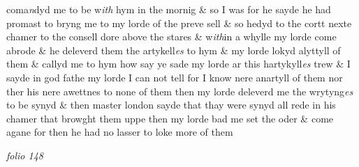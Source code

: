 \documentclass[12pt, a4paper]{book}
\begin{document}
 coma\textit{n}dyd me to be w\textit{ith} hym in the mornig \& so I was for he sayde he
 had promast to bryng me to my
			 lorde of the preve sell \& so hedyd to the
 cortt nexte chamer to the consell dore above the stares \& w\textit{ith}in a
 whylle my lorde come abrode \& he deleverd them the artykell\textit{es} to hym
 \& my lorde lokyd alyttyll of them \& callyd me to hym
			 how say ye sade
 my lorde ar this hartykyll\textit{es} trew \& I sayde in god fathe my lorde I
 can not tell for I know nere anartyll of them nor ther his nere awettnes
 to none of them then my lorde deleverd me the wrytyng\textit{es }to be synyd \&
 		then master london sayde that thay were synyd all rede in his chamer
 that browght them uppe then my lorde bad me set the oder \& come agane
 for then he had no lasser to loke more of them

\dotfill
					

\textit{folio 148}
\end{document}
